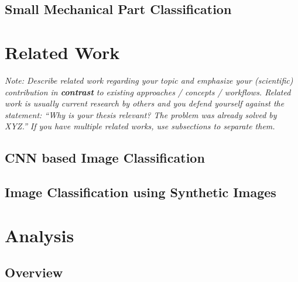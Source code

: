 \documentclass[a4paper,12pt,twoside]{report}
\begin{document}
\section{Small Mechanical Part Classification}











\chapter{Related Work}

\textit{Note: Describe related work regarding your topic and emphasize your (scientific) contribution in \textbf{contrast} to existing approaches / concepts / workflows. Related work is usually current research by others and you defend yourself against the statement: ``Why is your thesis relevant? The problem was already solved by XYZ.'' If you have multiple related works, use subsections to separate them.}

\section{CNN based Image Classification}
\section{Image Classification using Synthetic Images}











\chapter{Analysis}


\section{Overview}
\end{document}
